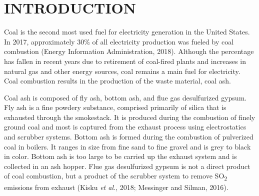 \documentclass[ms, hidelinks]{uncgdissertationexp}
\theoremstyle{plain}
\theoremstyle{definition}
\theoremstyle{remark}
\begin{document}
\tableofcontents


  \listoftables
  


\listoffigures


\mainmatter %
\setlength{\parindent}{0.5in}

\hypertarget{intro}{%
\chapter{INTRODUCTION}\label{intro}}

Coal is the second most used fuel for electricity generation in the United States. In 2017, approximately 30\% of all electricity production was fueled by coal combustion (Energy Information Administration, 2018). Although the percentage has fallen in recent years due to retirement of coal-fired plants and increases in natural gas and other energy sources, coal remains a main fuel for electricity. Coal combustion results in the production of the waste material, coal ash.

Coal ash is composed of fly ash, bottom ash, and flue gas desulfurized gypsum. Fly ash is a fine powdery substance, comprised primarily of silica that is exhausted through the smokestack. It is produced during the combustion of finely ground coal and most is captured from the exhaust process using electrostatics and scrubber systems. Bottom ash is formed during the combustion of pulverized coal in boilers. It ranges in size from fine sand to fine gravel and is grey to black in color. Bottom ash is too large to be carried up the exhaust system and is collected in an ash hopper. Flue gas desulfurized gypsum is not a direct product of coal combustion, but a product of the scrubber system to remove SO\textsubscript{2} emissions from exhaust (Kisku \emph{et al.}, 2018; Messinger and Silman, 2016).
\end{document}
